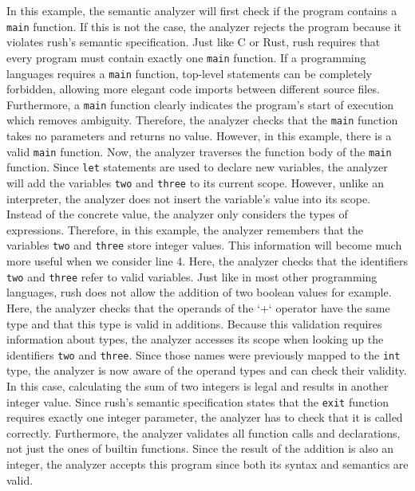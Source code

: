 In this example, the semantic analyzer will first check if the program contains
a \texttt{main} function. If this is not the case, the analyzer rejects the program
because it violates rush's semantic specification. Just like C or Rust, rush
requires that every program must contain exactly one \texttt{main} function. If a
programming languages requires a \texttt{main} function, top-level statements can be
completely forbidden, allowing more elegant code imports between different
source files. Furthermore, a \texttt{main} function clearly indicates the program's
start of execution which removes ambiguity. Therefore, the analyzer checks that
the \texttt{main} function takes no parameters and returns no value. However, in this
example, there is a valid \texttt{main} function. Now, the analyzer traverses the
function body of the \texttt{main} function. Since \texttt{let} statements are used to declare
new variables, the analyzer will add the variables \texttt{two} and \texttt{three} to its
current scope. However, unlike an interpreter, the analyzer does not insert the
variable's value into its scope. Instead of the concrete value, the analyzer
only considers the types of expressions. Therefore, in this example, the
analyzer remembers that the variables \texttt{two} and \texttt{three} store integer values.
This information will become much more useful when we consider line 4. Here, the
analyzer checks that the identifiers \texttt{two} and \texttt{three} refer to valid variables.
Just like in most other programming languages, rush does not allow the addition
of two boolean values for example. Here, the analyzer checks that the operands
of the `+` operator have the same type and that this type is valid in additions.
Because this validation requires information about types, the analyzer accesses
its scope when looking up the identifiers \texttt{two} and \texttt{three}. Since those names
were previously mapped to the \texttt{int} type, the analyzer is now aware of the
operand types and can check their validity. In this case, calculating the
sum of two integers is legal and results in another integer value. Since rush's
semantic specification states that the \texttt{exit} function requires exactly one
integer parameter, the analyzer has to check that it is called correctly.
Furthermore, the analyzer validates all function calls and declarations, not
just the ones of builtin functions. Since the result of the addition is also an
integer, the analyzer accepts this program since both its syntax and semantics
are valid.

